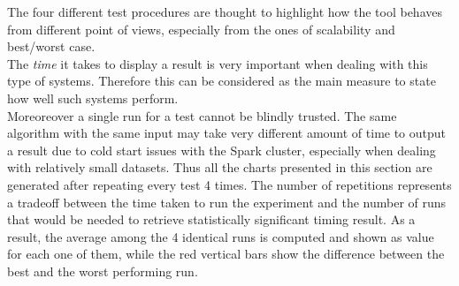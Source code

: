 \documentclass{sig-alternate-05-2015}
\begin{document}
The four different test procedures are thought to highlight how the tool behaves from different point of views, especially from the ones of scalability and best/worst case.\\
The \emph{time} it takes to display a result is very important when dealing with this type of systems. Therefore this can be considered as the main measure to state how well such systems perform.\\
Moreoreover a single run for a test cannot be blindly trusted. The same algorithm with the same input may take very different amount of time to output a result due to cold start issues with the Spark cluster, especially when dealing with relatively small datasets. Thus all the charts presented in this section are generated after repeating every test 4 times. The number of repetitions represents a tradeoff between the time taken to run the experiment and the number of runs that would be needed to retrieve statistically significant timing result. As a result, the average among the 4 identical runs is computed and shown as value for each one of them, while the red vertical bars show the difference between the best and the worst performing run.\\
\end{document}
